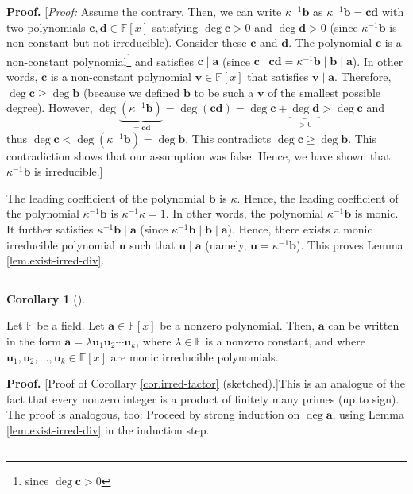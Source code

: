 \documentclass[numbers=enddot,12pt,final,onecolumn,notitlepage]{scrartcl}%
\theoremstyle{definition}
\newtheorem{coro}[theo]{Corollary}
\newenvironment{corollary}[1][]
{\begin{coro}[#1]\begin{leftbar}}
{\end{leftbar}\end{coro}}
\newenvironment{proof}[1][Proof]{\noindent\textbf{#1.} }{\ \rule{0.5em}{0.5em}}
\begin{document}
\begin{proof}
[\textit{Proof:} Assume the contrary. Then, we can write $\kappa
^{-1}\mathbf{b}$ as $\kappa^{-1}\mathbf{b}=\mathbf{cd}$ with two polynomials
$\mathbf{c},\mathbf{d}\in\mathbb{F}\left[  x\right]  $ satisfying
$\deg\mathbf{c}>0$ and $\deg\mathbf{d}>0$ (since $\kappa^{-1}\mathbf{b}$ is
non-constant but not irreducible). Consider these $\mathbf{c}$ and
$\mathbf{d}$. The polynomial $\mathbf{c}$ is a non-constant
polynomial\footnote{since $\deg\mathbf{c}>0$} and satisfies $\mathbf{c}%
\mid\mathbf{a}$ (since $\mathbf{c}\mid\mathbf{cd}=\kappa^{-1}\mathbf{b}%
\mid\mathbf{b}\mid\mathbf{a}$). In other words, $\mathbf{c}$ is a non-constant
polynomial $\mathbf{v}\in\mathbb{F}\left[  x\right]  $ that satisfies
$\mathbf{v}\mid\mathbf{a}$. Therefore, $\deg\mathbf{c}\geq\deg\mathbf{b}$
(because we defined $\mathbf{b}$ to be such a $\mathbf{v}$ of the smallest
possible degree). However, $\deg\underbrace{\left(  \kappa^{-1}\mathbf{b}%
\right)  }_{=\mathbf{cd}}=\deg\left(  \mathbf{cd}\right)  =\deg\mathbf{c}%
+\underbrace{\deg\mathbf{d}}_{>0}>\deg\mathbf{c}$ and thus $\deg
\mathbf{c}<\deg\left(  \kappa^{-1}\mathbf{b}\right)  =\deg\mathbf{b}$. This
contradicts $\deg\mathbf{c}\geq\deg\mathbf{b}$. This contradiction shows that
our assumption was false. Hence, we have shown that $\kappa^{-1}\mathbf{b}$ is irreducible.]

The leading coefficient of the polynomial $\mathbf{b}$ is $\kappa$. Hence, the
leading coefficient of the polynomial $\kappa^{-1}\mathbf{b}$ is $\kappa
^{-1}\kappa=1$. In other words, the polynomial $\kappa^{-1}\mathbf{b}$ is
monic. It further satisfies $\kappa^{-1}\mathbf{b}\mid\mathbf{a}$ (since
$\kappa^{-1}\mathbf{b}\mid\mathbf{b}\mid\mathbf{a}$). Hence, there exists a
monic irreducible polynomial $\mathbf{u}$ such that $\mathbf{u}\mid\mathbf{a}$
(namely, $\mathbf{u}=\kappa^{-1}\mathbf{b}$). This proves Lemma
\ref{lem.exist-irred-div}.
\end{proof}

\begin{corollary}
\label{cor.irred-factor}Let $\mathbb{F}$ be a field. Let $\mathbf{a}%
\in\mathbb{F}\left[  x\right]  $ be a nonzero polynomial. Then, $\mathbf{a}$
can be written in the form $\mathbf{a}=\lambda\mathbf{u}_{1}\mathbf{u}%
_{2}\cdots\mathbf{u}_{k}$, where $\lambda\in\mathbb{F}$ is a nonzero constant,
and where $\mathbf{u}_{1},\mathbf{u}_{2},\ldots,\mathbf{u}_{k}\in
\mathbb{F}\left[  x\right]  $ are monic irreducible polynomials.
\end{corollary}

\begin{proof}
[Proof of Corollary \ref{cor.irred-factor} (sketched).]This is an analogue of
the fact that every nonzero integer is a product of finitely many primes (up
to sign). The proof is analogous, too: Proceed by strong induction on
$\deg\mathbf{a}$, using Lemma \ref{lem.exist-irred-div} in the induction step.
\end{proof}
\end{document}
